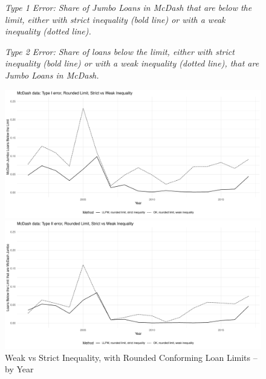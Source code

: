 \documentclass{article}
\begin{document}
\begin{figure}
    
    \caption{Weak vs Strict Inequality, with Rounded Conforming Loan Limits -- by Year}

    \bigskip
    
    \emph{Type 1 Error: Share of Jumbo Loans in McDash that are below the limit, either with strict inequality (bold line) or with a weak inequality (dotted line).}

\emph{Type 2 Error: Share of loans below the limit, either with strict inequality (bold line) or with a weak inequality (dotted line), that are Jumbo Loans in McDash.}

    \begin{center}
        \includegraphics[scale=0.5]{figures/type1error_weak_vs_strict.pdf}
    \end{center}
    
    \bigskip
    
    \begin{center}
        \includegraphics[scale=0.5]{figures/type2error_weak_vs_strict.pdf}
    \end{center}
            
    
\end{figure}
    
\end{document}
